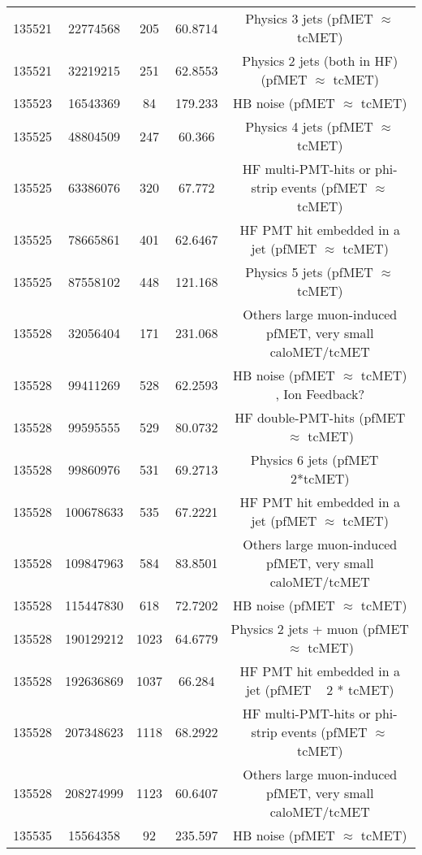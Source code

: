 \begin{table}[htbp]
\begin{center}
\begin{tabular}{|c|c|c|c|c|}
      135521 & 22774568    &  205  &    60.8714  & Physics 3 jets (pfMET $\approx$ tcMET) \\
      135521 & 32219215    &  251  &    62.8553  & Physics 2 jets (both in HF) (pfMET $\approx$ tcMET) \\ 
      135523 & 16543369    &  84   &    179.233  & HB noise (pfMET $\approx$ tcMET) \\
      135525 & 48804509    &  247  &    60.366   & Physics 4 jets (pfMET $\approx$ tcMET) \\
      135525 & 63386076    &  320  &    67.772   & HF multi-PMT-hits or phi-strip events (pfMET $\approx$ tcMET) \\
      135525 & 78665861    &  401  &    62.6467  & HF PMT hit embedded in a jet (pfMET $\approx$ tcMET) \\
      135525 & 87558102    &  448  &    121.168  & Physics 5 jets (pfMET $\approx$ tcMET) \\
      135528 & 32056404    &  171  &    231.068  & Others large muon-induced pfMET, very small caloMET/tcMET \\
      135528 & 99411269    &  528  &    62.2593  & HB noise (pfMET $\approx$ tcMET) , Ion Feedback? \\
      135528 & 99595555    &  529  &    80.0732  & HF double-PMT-hits (pfMET $\approx$ tcMET) \\
      135528 & 99860976    &  531  &    69.2713  & Physics 6 jets (pfMET ~ 2*tcMET) \\
      135528 & 100678633   &  535  &    67.2221  & HF PMT hit embedded in a jet (pfMET $\approx$ tcMET) \\
      135528 & 109847963   &  584  &    83.8501  & Others large muon-induced pfMET, very small caloMET/tcMET \\
      135528 & 115447830   &  618  &    72.7202  & HB noise (pfMET $\approx$ tcMET) \\
      135528 & 190129212   &  1023 &    64.6779  & Physics 2 jets + muon (pfMET $\approx$ tcMET) \\
      135528 & 192636869   &  1037 &    66.284   & HF PMT hit embedded in a jet (pfMET ~ 2 * tcMET) \\
      135528 & 207348623   &  1118 &    68.2922  & HF multi-PMT-hits or phi-strip events (pfMET $\approx$ tcMET) \\
      135528 & 208274999   &  1123 &    60.6407  & Others large muon-induced pfMET, very small caloMET/tcMET \\
      135535 & 15564358    &  92   &    235.597  & HB noise (pfMET $\approx$ tcMET) \\

\end{tabular}
\end{center}
\end{table}

